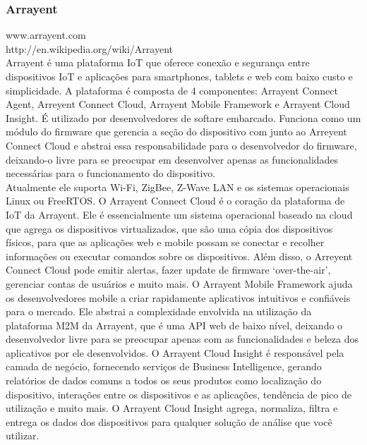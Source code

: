 \subsubsection{Arrayent}
www.arrayent.com\\
http://en.wikipedia.org/wiki/Arrayent\\
Arrayent \cite{arrayent} é uma plataforma IoT que oferece conexão e segurança entre dispositivos IoT e aplicações para  smartphones, tablets e web com baixo custo e simplicidade. A plataforma é composta de 4 componentes: Arrayent Connect Agent, Arreyent Connect Cloud, Arrayent Mobile Framework e Arrayent Cloud Insight.
É utilizado por desenvolvedores de softare embarcado. Funciona como um módulo do firmware que gerencia a seção do dispositivo com junto ao Arreyent Connect Cloud e abstrai essa responsabilidade para o desenvolvedor do firmware, deixando-o livre para se preocupar em desenvolver apenas as funcionalidades necessárias para o funcionamento do dispositivo.\\
Atualmente ele suporta Wi-Fi, ZigBee, Z-Wave LAN e os sistemas operacionais Linux ou FreeRTOS.
O Arrayent Connect Cloud é o coração da plataforma de IoT da Arrayent. Ele é essencialmente um sistema operacional baseado na cloud que agrega os dispositivos virtualizados, que são uma cópia dos dispositivos físicos,  para que as aplicações web e mobile possam se conectar e recolher informações ou executar comandos sobre os dispositivos. Além disso, o Arreyent Connect Cloud pode emitir alertas, fazer update de firmware \lq over-the-air\rq, gerenciar contas de usuários e muito mais.
O Arrayent Mobile Framework ajuda os desenvolvedores mobile a criar rapidamente aplicativos intuitivos e confiáveis para o mercado. Ele abstrai a complexidade envolvida na utilização da plataforma M2M da Arrayent, que é uma API web de baixo nível, deixando o desenvolvedor livre para se preocupar apenas com as funcionalidades e beleza dos aplicativos por ele desenvolvidos.
O Arrayent Cloud Insight é responsável pela camada de negócio, fornecendo serviços de Business Intelligence, gerando relatórios de dados comuns a todos os seus produtos como localização do dispositivo, interações entre os dispositivos e as aplicações, tendência de pico de utilização e muito mais. O Arrayent Cloud Insight agrega, normaliza, filtra e entrega os dados dos dispositivos para qualquer solução de análise que você utilizar.


